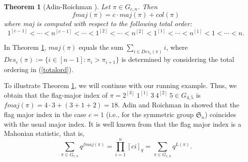 \documentclass[a4paper,12pt]{article}
\newtheorem{thm}{Theorem}[section]
\begin{document}
\begin{thm} [Adin-Roichman \cite{adin2001}]\label{adinroichman}
Let $\pi \in G_{c,n}$. Then
\begin{equation}\label{fmaj2001}
fmaj(\pi)=c \cdot maj(\pi)+col(\pi)
\end{equation}
where maj is computed with respect to the following total order: 
\begin{equation}\label{totalord}
1^{[c-1]}<\cdots<n^{[c-1]}<\cdots<1^{[2]}<\cdots<n^{[2]}<1^{[1]}<\cdots<n^{[1]}<1<\cdots < n.
\end{equation}
\end{thm}
In Theorem \ref{adinroichman}, $maj(\pi)$ equals the sum $\sum_{i \in Des_c(\pi)}i$, where $Des_c(\pi):=\{i \in [n-1]: \pi_i > \pi_{i+1}\}$ is determined by considering the total ordering in (\ref{totalord}).

To illustrate Theorem \ref{adinroichman}, we will continue with our running example. Thus, we obtain that the flag-major index of $\pi=2^{[3]} ~1^{[1]} ~3~4^{[2]}~5 \in G_{4,5}$ is $fmaj(\pi)=4 \cdot 3+(3+1+2)=18$. 
Adin and Roichman in \cite{adin2001} showed that the flag major index in the case $c=1$ (i.e., for the symmetric group $\mathfrak{S}_n$) coincides
with the usual major index. It is well known from \cite{arslan2024} that the flag major index  is a Mahonian statistic, that is, 
\begin{equation}\label{eflag}
\sum_{\pi \in G_{c,n}}q^{fmaj(\pi)}=\prod_{i=1}^n [ci]_q=\sum_{\pi \in G_{c,n}} q^{L(\pi)}.
\end{equation}
\end{document}
